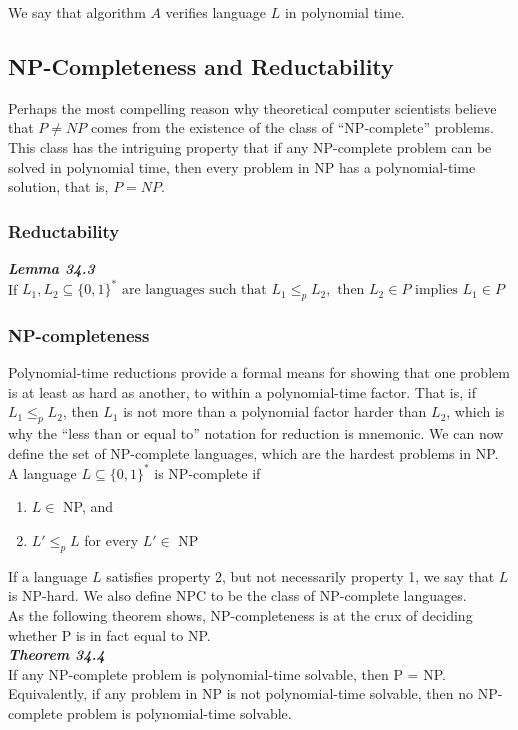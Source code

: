 We say that algorithm $A$ verifies language $L$ in polynomial time. 

\subsection{NP-Completeness and Reductability}
Perhaps the most compelling reason why theoretical computer scientists believe that $P \neq NP$ comes from the existence of the class of ``NP-complete'' problems. This class has the intriguing property that if any NP-complete problem can be solved in polynomial time, then every problem in NP has a polynomial-time solution, that is, $P = NP$.

\subsubsection{Reductability}
\textbf{\textit{Lemma 34.3}} \\
If $L_1, L_2 \subseteq \{0, 1\}^* \text{ are languages such that } L_1 \leq_p L_2, \text{ then } L_2 \in P \text{ implies } L_1 \in P $

\subsubsection{NP-completeness}
Polynomial-time reductions provide a formal means for showing that one problem is at least as hard as another, to within a polynomial-time factor. That is, if $L_1 \leq_p L_2$, then $L_1$ is not more than a polynomial factor harder than $L_2$, which is why the ``less than or equal to'' notation for reduction is mnemonic. We can now define the set of NP-complete languages, which are the hardest problems in NP.
A language $L \subseteq \{0, 1\}^*$ is NP-complete if

\begin{enumerate}
	\item $L \in$ NP, and
	\item $L' \leq_p L$ for every $L' \in$ NP
\end{enumerate}

If a language $L$ satisfies property 2, but not necessarily property 1, we say that $L$ is NP-hard. We also define NPC to be the class of NP-complete languages.\\

As the following theorem shows, NP-completeness is at the crux of deciding whether P is in fact equal to NP.\\

\textbf{\textit{Theorem 34.4}} \\
If any NP-complete problem is polynomial-time solvable, then P = NP. Equivalently, if any problem in NP is not polynomial-time solvable, then no NP-complete problem is polynomial-time solvable.

